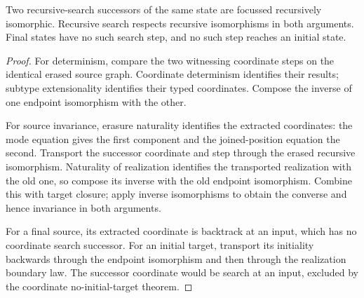 \begin{theorem}
Two recursive-search successors of the same state are focussed recursively
isomorphic. Recursive search respects recursive isomorphisms in both arguments.
Final states have no such search step, and no such step reaches an initial
state.
\end{theorem}
\begin{proof}
For determinism, compare the two witnessing coordinate steps on the identical
erased source graph. Coordinate determinism identifies their results; subtype
extensionality identifies their typed coordinates. Compose the inverse of
one endpoint isomorphism with the other.

For source invariance, erasure naturality identifies the extracted coordinates:
the mode equation gives the first component and the joined-position equation
the second. Transport the successor coordinate and step through the erased
recursive isomorphism. Naturality of realization identifies the transported
realization with the old one, so compose its inverse with the old endpoint
isomorphism. Combine this with target closure; apply inverse isomorphisms to
obtain the converse and hence invariance in both arguments.

For a final source, its extracted coordinate is backtrack at an input, which
has no coordinate search successor. For an initial target, transport its
initiality backwards through the endpoint isomorphism and then through the
realization boundary law. The successor coordinate would be search at an
input, excluded by the coordinate no-initial-target theorem.
\end{proof}

